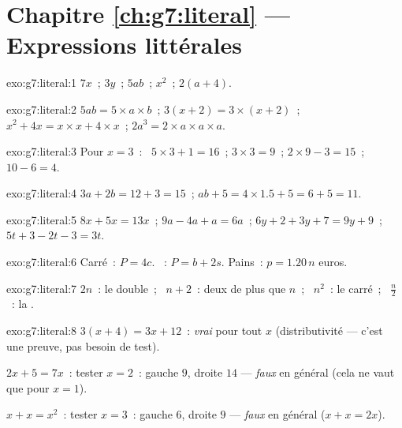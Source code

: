 \section*{Chapitre \ref{ch:g7:literal} --- Expressions littérales}

\begin{solution}{exo:g7:literal:1}
$7x$~; \quad $3y$~; \quad $5ab$~; \quad $x^2$~; \quad $2(a + 4)$.
\end{solution}

\begin{solution}{exo:g7:literal:2}
$5ab = 5 \times a \times b$~; \quad
$3(x+2) = 3 \times (x + 2)$~; \quad
$x^2 + 4x = x \times x + 4 \times x$~; \quad
$2a^3 = 2 \times a \times a \times a$.
\end{solution}

\begin{solution}{exo:g7:literal:3}
Pour $x = 3$~: \ $5 \times 3 + 1 = 16$~; \quad $3 \times 3 = 9$~; \quad
$2 \times 9 - 3 = 15$~; \quad $10 - 6 = 4$.
\end{solution}

\begin{solution}{exo:g7:literal:4}
$3a + 2b = 12 + 3 = 15$~; \qquad
$ab + 5 = 4 \times 1.5 + 5 = 6 + 5 = 11$.
\end{solution}

\begin{solution}{exo:g7:literal:5}
$8x + 5x = 13x$~; \quad
$9a - 4a + a = 6a$~; \quad
$6y + 2 + 3y + 7 = 9y + 9$~; \quad
$5t + 3 - 2t - 3 = 3t$.
\end{solution}

\begin{solution}{exo:g7:literal:6}
Carré~: $P = 4c$. ~: $P = b + 2s$. Pains~:
$p = 1.20\,n$ euros.
\end{solution}

\begin{solution}{exo:g7:literal:7}
$2n$~: le double~; \ $n + 2$~: deux de plus que $n$~; \ $n^2$~: le
carré~; \ $\frac n2$~: la .
\end{solution}

\begin{solution}{exo:g7:literal:8}
$3(x+4) = 3x + 12$~: \emph{vrai} pour tout $x$ (distributivité ---
c'est une preuve, pas besoin de test).

$2x + 5 = 7x$~: tester $x = 2$~: gauche $9$, droite $14$ ---
\emph{faux} en général (cela ne vaut que pour $x = 1$).

$x + x = x^2$~: tester $x = 3$~: gauche $6$, droite $9$ ---
\emph{faux} en général ($x + x = 2x$).
\end{solution}

